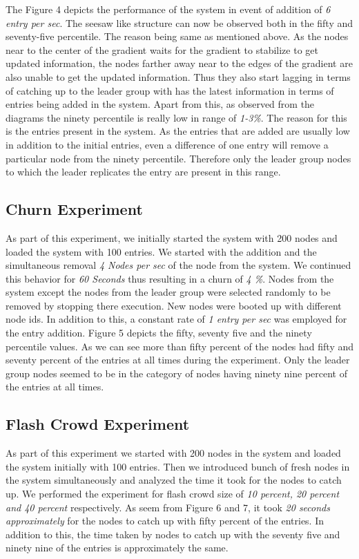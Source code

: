 \documentclass[a4paper, 11pt]{article}
\begin{document}
\par The Figure 4 depicts the performance of the system in event of addition of \textit{6 entry per sec}. The seesaw like structure can now be observed both in the fifty and seventy-five percentile. The reason being same as mentioned above. As the nodes near to the center of the gradient waits for the gradient to stabilize to get updated information, the nodes farther away near to the edges of the gradient are also unable to get the updated information. Thus they also start lagging in terms of catching up to the leader group with has the latest information in terms of entries being added in the system. Apart from this, as observed from the diagrams the ninety percentile is really low in range of \textit{1-3\%}. The reason for this is the entries present in the system. As the entries that are added are usually low in addition to the initial entries, even a difference of one entry will remove a particular node from the ninety percentile. Therefore only the leader group nodes to which the leader replicates the entry are present in this range.






\subsection{Churn Experiment}

As part of this experiment, we initially started the system with 200 nodes and loaded the system with 100 entries. We started with the addition and the simultaneous removal \textit{4 Nodes per sec} of the node from the system. We continued this behavior for \textit{60 Seconds} thus resulting in a churn of \textit{4 \%}. Nodes from the system except the nodes from the leader group were selected randomly to be removed by stopping there execution. New nodes were booted up with different node ids. In addition to this, a constant rate of \textit{1 entry per sec} was employed for the entry addition. Figure 5 depicts the fifty, seventy five and the ninety percentile values. As we can see more than fifty percent of the nodes had fifty and seventy percent of the entries at all times during the experiment. Only the leader group nodes seemed to be in the category of nodes having ninety nine percent of the entries at all times. 



\subsection{Flash Crowd Experiment}
As part of this experiment we started with 200 nodes in the system and loaded the system initially with 100 entries. Then we introduced bunch of fresh nodes in the system simultaneously and analyzed the time it took for the nodes to catch up. We performed the experiment for flash crowd size of \textit{10 percent, 20 percent and 40 percent} respectively. As seem from Figure 6 and 7, it took \textit{20 seconds approximately} for the nodes to catch up with fifty percent of the entries. In addition to this, the time taken by nodes to catch up with the seventy five and ninety nine of the entries is approximately the same. 
\end{document}
